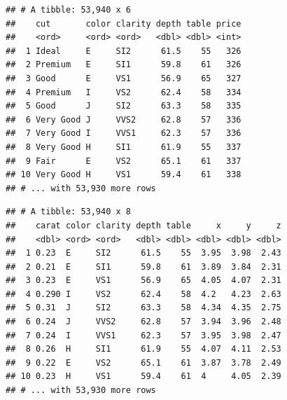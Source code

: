 \documentclass[
]{book}
\newenvironment{Shaded}{\begin{snugshade}}{\end{snugshade}}
\newcommand{\CommentTok}[1]{\textcolor[rgb]{0.56,0.35,0.01}{\textit{#1}}}
\newcommand{\KeywordTok}[1]{\textcolor[rgb]{0.13,0.29,0.53}{\textbf{#1}}}
\newcommand{\NormalTok}[1]{#1}
\newcommand{\OperatorTok}[1]{\textcolor[rgb]{0.81,0.36,0.00}{\textbf{#1}}}
\newcommand{\StringTok}[1]{\textcolor[rgb]{0.31,0.60,0.02}{#1}}
\begin{document}
\begin{Shaded}
\end{Shaded}

\begin{verbatim}
## # A tibble: 53,940 x 6
##    cut       color clarity depth table price
##    <ord>     <ord> <ord>   <dbl> <dbl> <int>
##  1 Ideal     E     SI2      61.5    55   326
##  2 Premium   E     SI1      59.8    61   326
##  3 Good      E     VS1      56.9    65   327
##  4 Premium   I     VS2      62.4    58   334
##  5 Good      J     SI2      63.3    58   335
##  6 Very Good J     VVS2     62.8    57   336
##  7 Very Good I     VVS1     62.3    57   336
##  8 Very Good H     SI1      61.9    55   337
##  9 Fair      E     VS2      65.1    61   337
## 10 Very Good H     VS1      59.4    61   338
## # ... with 53,930 more rows
\end{verbatim}

\begin{Shaded}
\end{Shaded}

\begin{verbatim}
## # A tibble: 53,940 x 8
##    carat color clarity depth table     x     y     z
##    <dbl> <ord> <ord>   <dbl> <dbl> <dbl> <dbl> <dbl>
##  1 0.23  E     SI2      61.5    55  3.95  3.98  2.43
##  2 0.21  E     SI1      59.8    61  3.89  3.84  2.31
##  3 0.23  E     VS1      56.9    65  4.05  4.07  2.31
##  4 0.290 I     VS2      62.4    58  4.2   4.23  2.63
##  5 0.31  J     SI2      63.3    58  4.34  4.35  2.75
##  6 0.24  J     VVS2     62.8    57  3.94  3.96  2.48
##  7 0.24  I     VVS1     62.3    57  3.95  3.98  2.47
##  8 0.26  H     SI1      61.9    55  4.07  4.11  2.53
##  9 0.22  E     VS2      65.1    61  3.87  3.78  2.49
## 10 0.23  H     VS1      59.4    61  4     4.05  2.39
## # ... with 53,930 more rows
\end{verbatim}
\end{document}
